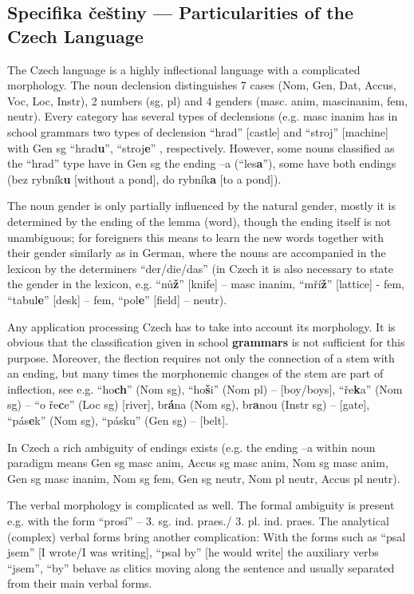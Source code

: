 \documentclass[]{../../metanetpaper}
\begin{document}
\begin{multicols}{2}
\subsection{Specifika češtiny --- Particularities of the Czech Language }

The Czech language is a highly inflectional language with a complicated morphology. The noun declension distinguishes 7 cases (Nom, Gen, Dat, Accus, Voc, Loc, Instr), 2 numbers (sg, pl) and 4 genders (masc. anim, mascinanim, fem, neutr). Every category has several types of declensions (e.g. masc inanim has in school grammars two types of declension “hrad” {[}castle{]} and “stroj” {[}machine{]} with Gen sg “hrad\textbf{u}”, “stroj\textbf{e}” , respectively. However, some nouns classified as the “hrad” type have in Gen sg the ending –a (“les\textbf{a}”), some have both endings (bez rybník\textbf{u} {[}without a pond{]}, do rybník\textbf{a} {[}to a pond{]}).

The noun gender is only partially influenced by the natural gender, mostly it is determined by the ending of the lemma (word), though the ending itself  is not unambiguous; for foreigners this means to learn the new words together with their gender similarly as in German, where the nouns are accompanied in the lexicon by the determiners “der/die/das”  (in Czech it is also necessary to state the gender in the lexicon, e.g. “nů\textbf{ž}” {[}knife{]} – masc inanim, “mří\textbf{ž}”  {[}lattice{]} -  fem, “tabul\textbf{e}” {[}desk{]} – fem, “pol\textbf{e}” {[}field{]} – neutr).

Any application processing Czech has to take into account its morphology. It is obvious that the classification given in school \textbf{grammars} is not sufficient for this purpose. Moreover, the flection requires not only the connection of a stem with an ending, but many times the morphonemic changes of the stem are part of inflection, see e.g. “ho\textbf{ch}” (Nom sg), “ho\textbf{š}i” (Nom pl) – {[}boy/boys{]}, “ře\textbf{k}a” (Nom sg) – “o ře\textbf{c}e” (Loc sg) {[}river{]}, br\textbf{á}na (Nom sg), br\textbf{a}nou (Instr sg) – {[}gate{]}, “pás\textbf{e}k” (Nom sg), “pásku” (Gen sg) – {[}belt{]}.

In Czech a rich ambiguity of endings exists (e.g. the ending –a within noun paradigm means Gen sg masc anim, Accus sg masc anim, Nom sg masc anim, Gen sg masc inanim, Nom sg fem, Gen sg neutr, Nom pl neutr, Accus pl neutr).

The verbal morphology is complicated as well. The formal ambiguity is present e.g. with the form “prosí” – 3. sg. ind. praes./ 3. pl. ind. praes. The analytical (complex) verbal forms bring another complication: With the forms such as “psal jsem” {[}I wrote/I was writing{]}, “psal by” {[}he would write{]} the auxiliary verbs “jsem”, “by”  behave as clitics moving along the sentence and usually separated from their main verbal forms.


\end{multicols}
\end{document}
